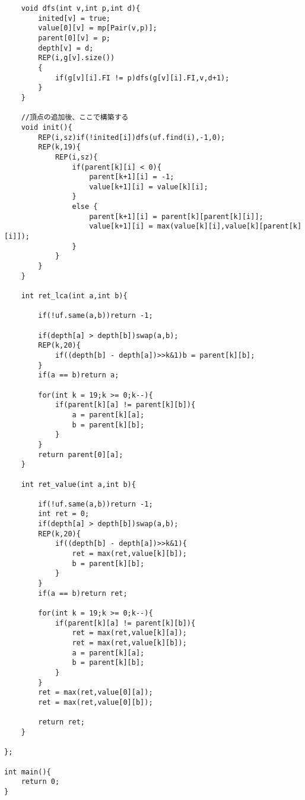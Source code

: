 \documentclass[10pt]{article}
\begin{document}
\begin{lstlisting}
	void dfs(int v,int p,int d){
		inited[v] = true;
		value[0][v] = mp[Pair(v,p)];
		parent[0][v] = p;
		depth[v] = d;
		REP(i,g[v].size())
		{
			if(g[v][i].FI != p)dfs(g[v][i].FI,v,d+1);
		}
	}

	//頂点の追加後、ここで構築する
	void init(){
		REP(i,sz)if(!inited[i])dfs(uf.find(i),-1,0);
		REP(k,19){
			REP(i,sz){
				if(parent[k][i] < 0){
					parent[k+1][i] = -1;
					value[k+1][i] = value[k][i];
				}
				else {
					parent[k+1][i] = parent[k][parent[k][i]];
					value[k+1][i] = max(value[k][i],value[k][parent[k][i]]);
				}
			}
		}
	}

	int ret_lca(int a,int b){

		if(!uf.same(a,b))return -1;

		if(depth[a] > depth[b])swap(a,b);
		REP(k,20){
			if((depth[b] - depth[a])>>k&1)b = parent[k][b];
		}
		if(a == b)return a;

		for(int k = 19;k >= 0;k--){
			if(parent[k][a] != parent[k][b]){
				a = parent[k][a];
				b = parent[k][b];
			}
		}
		return parent[0][a];
	}

	int ret_value(int a,int b){

		if(!uf.same(a,b))return -1;
		int ret = 0;
		if(depth[a] > depth[b])swap(a,b);
		REP(k,20){
			if((depth[b] - depth[a])>>k&1){
				ret = max(ret,value[k][b]);
				b = parent[k][b];
			}
		}
		if(a == b)return ret;

		for(int k = 19;k >= 0;k--){
			if(parent[k][a] != parent[k][b]){
				ret = max(ret,value[k][a]);
				ret = max(ret,value[k][b]);
				a = parent[k][a];
				b = parent[k][b];
			}
		}
		ret = max(ret,value[0][a]);
		ret = max(ret,value[0][b]);

		return ret;
	}

};

int main(){
	return 0;
}
\end{lstlisting}
\end{document}
